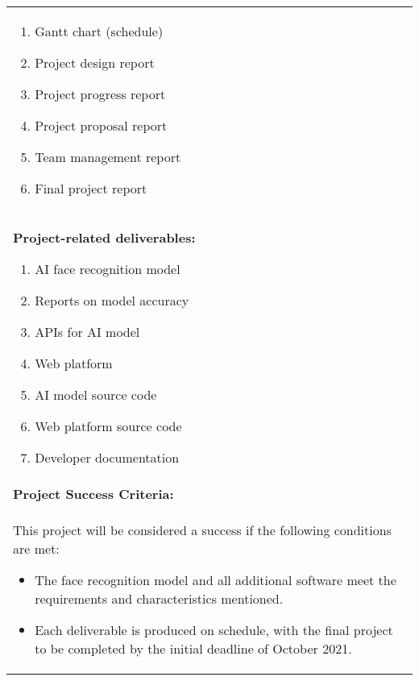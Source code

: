 \begin{longtable}{ | p{} l | }
{\begin{enumerate}
            \item Gantt chart (schedule)
            \item Project design report
            \item Project progress report
            \item Project proposal report
            \item Team management report
            \item Final project report
        \end{enumerate}
    } \\
    \multicolumn{2}{|p{\textwidth}|}{\textbf{Project-related deliverables:}
        \begin{enumerate}
            \item AI face recognition model
            \item Reports on model accuracy
            \item APIs for AI model
            \item Web platform
            \item AI model source code
            \item Web platform source code
            \item Developer documentation
        \end{enumerate}
    } \\
    \hline
    \multicolumn{2}{|l|}{\textbf{Project Success Criteria:}} \\
    \multicolumn{2}{|p{\textwidth}|}{This project will be considered a success if the following conditions are met:
        \begin{itemize}
            \item The face recognition model and all additional software meet the requirements and characteristics mentioned.
            \item Each deliverable is produced on schedule, with the final project to be completed by the initial deadline of October 2021.
        \end{itemize}
    } \\
    \hline
\end{longtable}
